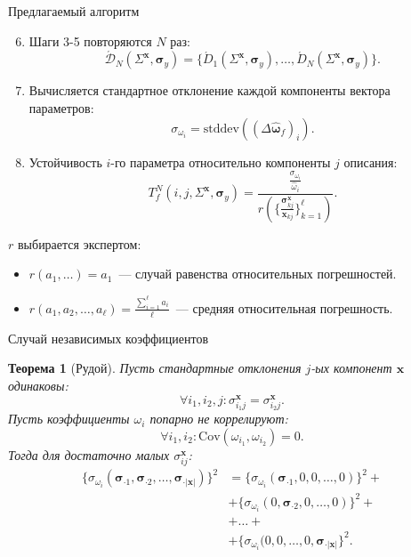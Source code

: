 \documentclass{beamer}
\newtheorem{theo}{Теорема}
\begin{document}
\begin{frame}{Предлагаемый алгоритм}
  \begin{enumerate}
    \setcounter{enumi}{5}
    \item Шаги 3-5 повторяются $N$ раз:
      \[
        \acute{\mathcal{D}}_N (\Sigma^{\mathbf{x}}, \boldsymbol{\sigma}_y) = \{ \acute{D}_1 (\Sigma^{\mathbf{x}}, \boldsymbol{\sigma}_y), \dots, \acute{D}_N (\Sigma^{\mathbf{x}}, \boldsymbol{\sigma}_y) \}.
      \]
    \item Вычисляется стандартное отклонение каждой компоненты вектора параметров:
      \[
        \sigma_{\omega_i} = \text{stddev} ((\Delta\hat{\boldsymbol{\omega}}_f)_i).
      \]
    \item Устойчивость $i$-го параметра относительно компоненты $j$ описания:
      \[
        T^N_f(i, j, \Sigma^{\mathbf{x}}, \boldsymbol{\sigma}_y) = \frac{\frac{\sigma_{\omega_i}}{\hat{\omega}_i}}{r(\{\frac{\boldsymbol{\sigma}^\mathbf{x}_{k j}}{\mathbf{x}_{k j}}\}_{k = 1}^{\ell})}.
      \]
  \end{enumerate}
  
  $r$ выбирается экспертом:
  \begin{itemize}
    \item $r(a_1, \dots) = a_1$~--- случай равенства относительных погрешностей.
    \item $r(a_1, a_2, \dots, a_{\ell}) = \frac{\sum_{i = 1}^{\ell} a_i}{\ell}$~--- средняя относительная погрешность.
  \end{itemize}
\end{frame}

\begin{frame}{Случай независимых коэффициентов}
  \begin{theo}[Рудой]
    Пусть стандартные отклонения $j$-ых компонент $\mathbf{x}$ одинаковы:
    \[
      \forall i_1, i_2, j: \sigma_{i_1 j}^{\mathbf{x}} = \sigma_{i_2 j}^{\mathbf{x}}.
    \]
    Пусть коэффициенты $\omega_i$ попарно не коррелируют:
    \[
      \forall i_1, i_2: \text{Cov} (\omega_{i_1}, \omega_{i_2}) = 0.
    \]
    Тогда для достаточно малых $\sigma_{ij}^\mathbf{x}$:
    \begin{align*}
      \{ \sigma_{\omega_i} (\boldsymbol{\sigma}_{\cdot 1}, \boldsymbol{\sigma}_{\cdot 2}, \dots, \boldsymbol{\sigma}_{\cdot |\mathbf{x}|}) \}^2 &=
        \{ \sigma_{\omega_i} (\boldsymbol{\sigma}_{\cdot 1}, 0, 0, \dots, 0) \}^2 + \nonumber \\
        & + \{ \sigma_{\omega_i} (0, \boldsymbol{\sigma}_{\cdot 2}, 0, \dots, 0) \}^2 + \nonumber \\
        & + \dots + \nonumber \\
        & + \{ \sigma_{\omega_i} (0, 0, \dots, 0, \boldsymbol{\sigma}_{\cdot |\mathbf{x}|} \}^2.
      \label{eq:pypha_variance}
    \end{align*}
  \end{theo}
\end{frame}
\end{document}
